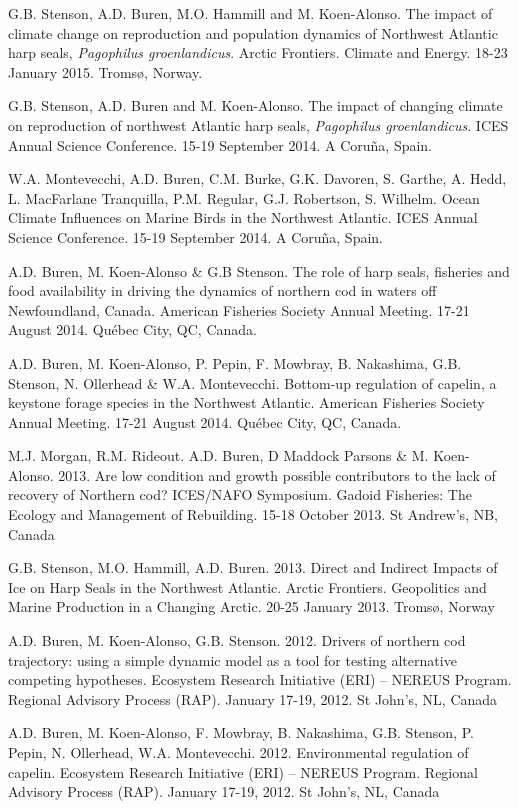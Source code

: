 \documentclass{res}
\begin{document}
\begin{resume}
\begin{hangparas}{.4in}{1}
G.B. Stenson, A.D. Buren, M.O. Hammill and M. Koen-Alonso. The impact of climate change on reproduction and population dynamics of Northwest Atlantic harp seals, \textit{Pagophilus groenlandicus}. Arctic Frontiers. Climate and Energy. 18-23 January 2015. Troms{\o}, Norway.

G.B. Stenson, A.D. Buren and M. Koen-Alonso. The impact of changing climate on reproduction of northwest Atlantic harp seals, \textit{Pagophilus groenlandicus}. ICES Annual Science Conference. 15-19 September 2014. A Coru\~{n}a, Spain.

W.A. Montevecchi, A.D. Buren, C.M. Burke, G.K. Davoren, S. Garthe, A. Hedd, L. MacFarlane Tranquilla, P.M. Regular, G.J. Robertson, S. Wilhelm. Ocean Climate Influences on Marine Birds in the Northwest Atlantic. ICES Annual Science Conference. 15-19 September 2014. A Coru\~{n}a, Spain.

A.D. Buren, M. Koen-Alonso \& G.B Stenson. The role of harp seals, fisheries and food availability in driving the dynamics of northern cod in waters off Newfoundland, Canada. American Fisheries Society Annual Meeting. 17-21 August 2014. Qu\'{e}bec City, QC, Canada.

A.D. Buren, M. Koen-Alonso, P. Pepin, F. Mowbray, B. Nakashima, G.B. Stenson, N. Ollerhead \& W.A. Montevecchi. Bottom-up regulation of capelin, a keystone forage species in the Northwest Atlantic. American Fisheries Society Annual Meeting. 17-21 August 2014. Qu\'{e}bec City, QC, Canada.

M.J. Morgan, R.M. Rideout. A.D. Buren, D Maddock Parsons \& M. Koen-Alonso. 2013. Are low condition and growth possible contributors to the lack of recovery of Northern cod? ICES/NAFO Symposium. Gadoid Fisheries: The Ecology and Management of Rebuilding. 15-18 October 2013. St Andrew's, NB, Canada

G.B. Stenson, M.O. Hammill, A.D. Buren. 2013. Direct and Indirect Impacts of Ice on Harp Seals in the Northwest Atlantic. Arctic Frontiers. Geopolitics and Marine Production in a Changing Arctic. 20-25 January 2013. Troms{\o}, Norway

A.D. Buren, M. Koen-Alonso, G.B. Stenson. 2012. Drivers of northern cod trajectory: using a simple dynamic model as a tool for testing alternative competing hypotheses. Ecosystem Research Initiative (ERI) – NEREUS Program. Regional Advisory Process (RAP). January 17-19, 2012. St John's, NL, Canada

A.D. Buren, M. Koen-Alonso, F. Mowbray, B. Nakashima, G.B. Stenson, P. Pepin, N. Ollerhead, W.A. Montevecchi. 2012. Environmental regulation of capelin. Ecosystem Research Initiative (ERI) – NEREUS Program. Regional Advisory Process (RAP). January 17-19, 2012. St John's, NL, Canada


\end{hangparas}
\end{resume}
\end{document}
